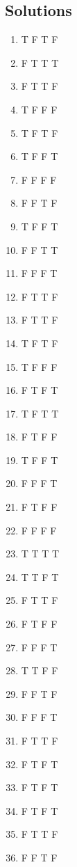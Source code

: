 \documentclass[10pt,a4paper]{article}
\begin{document}
\subsection{Solutions}
\begin{enumerate}[label=\textbf{\arabic*})]
\item T F T F
\item F T T T
\item F T T F
\item T F F F
\item T F T F
\item T F F T
\item F F F F
\item F F T F
\item T F F T
\item F F T T
\item F F F T
\item F T T F
\item F T T F
\item T F T F
\item T F F F
\item F T F T
\item T F T T
\item F T F F
\item T F F T
\item F F F T
\item F T F F
\item F F F F
\item T T T T
\item T T F T
\item F T T F
\item F T F F
\item F F F T
\item T T F F
\item F F T F
\item F F F T
\item F T T F
\item F T F T
\item F T F T
\item F T F T
\item F T T F
\item F F T F
\end{enumerate}
\end{document}
